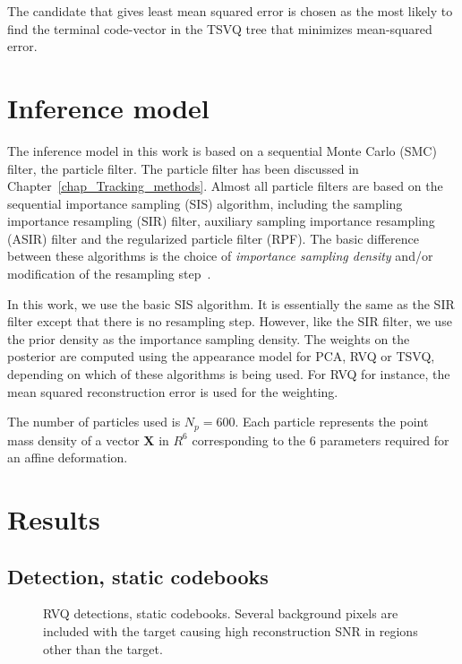 The candidate that gives least mean squared error is chosen as the most likely  to find the terminal code-vector in the TSVQ tree that minimizes mean-squared error.  

\section{Inference model}
The inference model in this work is based on a sequential Monte Carlo (SMC) filter, the particle filter.  The particle filter has been discussed in Chapter~\ref{chap_Tracking_methods}.  Almost all particle filters are based on the sequential importance sampling (SIS) algorithm, including the sampling importance resampling (SIR) filter, auxiliary sampling importance resampling (ASIR) filter and the regularized particle filter (RPF).  The basic difference between these algorithms is the choice of \emph{importance sampling density} and/or modification of the resampling step~\cite{2002_JNL_PF_Arulampalam}.  

In this work, we use the basic SIS algorithm.  It is essentially the same as the SIR filter except that there is no resampling step.  However, like the SIR filter, we use the prior density as the importance sampling density.  The weights on the posterior are computed using the appearance model for PCA, RVQ or TSVQ, depending on which of these algorithms is being used.  For RVQ for instance, the mean squared reconstruction error is used for the weighting.

The number of particles used is $N_p=600$.  Each particle represents the point mass density of a vector $\mathbf{X}$ in $R^6$ corresponding to the 6 parameters required for an affine deformation.

\cite{1992_JNL_MCMC_Carlin}
\section{Results}
\subsection{Detection, static codebooks}
								\begin{figure}[t]
								\centering	
								\caption{RVQ detections, static codebooks.  Several background pixels are included with the target causing high reconstruction SNR in regions other than the target.}										
								\label{fig:RVQdet_staticCB_oneTarget}				
								\end{figure}


